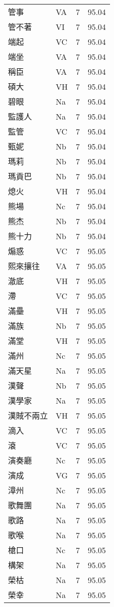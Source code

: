 \documentclass[twocolumn]{book}
\begin{document}
\begin{supertabular}{llrr}
管事 & VA & 7 &  95.04\\
管不著 & VI & 7 &  95.04\\
端起 & VC & 7 &  95.04\\
端坐 & VA & 7 &  95.04\\
稱臣 & VA & 7 &  95.04\\
碩大 & VH & 7 &  95.04\\
碧眼 & Na & 7 &  95.04\\
監護人 & Na & 7 &  95.04\\
監管 & VC & 7 &  95.04\\
甄妮 & Nb & 7 &  95.04\\
瑪莉 & Nb & 7 &  95.04\\
瑪貢巴 & Nb & 7 &  95.04\\
熄火 & VH & 7 &  95.04\\
熊場 & Nc & 7 &  95.04\\
熊杰 & Nb & 7 &  95.04\\
熊十力 & Nb & 7 &  95.04\\
煽惑 & VC & 7 &  95.05\\
熙來攘往 & VA & 7 &  95.05\\
澈底 & VH & 7 &  95.05\\
滯 & VC & 7 &  95.05\\
滿壘 & VH & 7 &  95.05\\
滿族 & Nb & 7 &  95.05\\
滿堂 & VH & 7 &  95.05\\
滿州 & Nc & 7 &  95.05\\
滿天星 & Na & 7 &  95.05\\
漢聲 & Nb & 7 &  95.05\\
漢學家 & Na & 7 &  95.05\\
漢賊不兩立 & VH & 7 &  95.05\\
滴入 & VC & 7 &  95.05\\
滾 & VC & 7 &  95.05\\
演奏廳 & Nc & 7 &  95.05\\
演成 & VG & 7 &  95.05\\
漳州 & Nc & 7 &  95.05\\
歌舞團 & Na & 7 &  95.05\\
歌路 & Na & 7 &  95.05\\
歌喉 & Na & 7 &  95.05\\
槍口 & Nc & 7 &  95.05\\
構架 & Na & 7 &  95.05\\
榮枯 & Na & 7 &  95.05\\
榮幸 & Na & 7 &  95.05\\

\end{supertabular}
\end{document}
